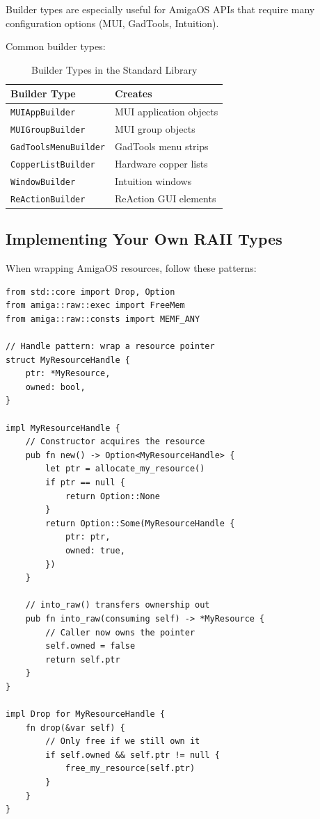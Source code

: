 Builder types are especially useful for AmigaOS APIs that require many configuration options (MUI, GadTools, Intuition).

Common builder types:

\begin{table}[h]
\centering
\begin{tabular}{ll}
\hline
\textbf{Builder Type} & \textbf{Creates} \\
\hline
\texttt{MUIAppBuilder} & MUI application objects \\
\texttt{MUIGroupBuilder} & MUI group objects \\
\texttt{GadToolsMenuBuilder} & GadTools menu strips \\
\texttt{CopperListBuilder} & Hardware copper lists \\
\texttt{WindowBuilder} & Intuition windows \\
\texttt{ReActionBuilder} & ReAction GUI elements \\
\hline
\end{tabular}
\caption{Builder Types in the Standard Library}
\end{table}

\subsection{Implementing Your Own RAII Types}

When wrapping AmigaOS resources, follow these patterns:

\begin{lstlisting}
from std::core import Drop, Option
from amiga::raw::exec import FreeMem
from amiga::raw::consts import MEMF_ANY

// Handle pattern: wrap a resource pointer
struct MyResourceHandle {
    ptr: *MyResource,
    owned: bool,
}

impl MyResourceHandle {
    // Constructor acquires the resource
    pub fn new() -> Option<MyResourceHandle> {
        let ptr = allocate_my_resource()
        if ptr == null {
            return Option::None
        }
        return Option::Some(MyResourceHandle {
            ptr: ptr,
            owned: true,
        })
    }

    // into_raw() transfers ownership out
    pub fn into_raw(consuming self) -> *MyResource {
        // Caller now owns the pointer
        self.owned = false
        return self.ptr
    }
}

impl Drop for MyResourceHandle {
    fn drop(&var self) {
        // Only free if we still own it
        if self.owned && self.ptr != null {
            free_my_resource(self.ptr)
        }
    }
}
\end{lstlisting}

